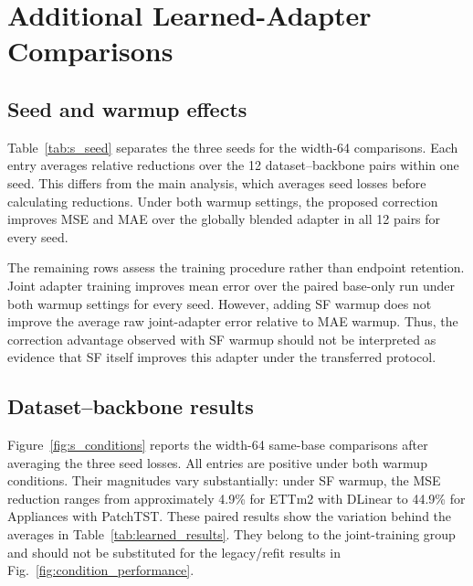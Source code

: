 \appendices
\setcounter{figure}{0}
\renewcommand{\thefigure}{S\arabic{figure}}
\renewcommand{\theHfigure}{supp.\arabic{figure}}
\setcounter{table}{2}
\renewcommand{\thetable}{S\arabic{table}}
\renewcommand{\theHtable}{supp.\arabic{table}}

\section{Additional Learned-Adapter Comparisons}
\label{app:learned}

\subsection{Seed and warmup effects}
Table~\ref{tab:s_seed} separates the three seeds for the width-64 comparisons. Each entry averages relative reductions over the 12 dataset--backbone pairs within one seed. This differs from the main analysis, which averages seed losses before calculating reductions. Under both warmup settings, the proposed correction improves MSE and MAE over the globally blended adapter in all 12 pairs for every seed.

The remaining rows assess the training procedure rather than endpoint retention. Joint adapter training improves mean error over the paired base-only run under both warmup settings for every seed. However, adding SF warmup does not improve the average raw joint-adapter error relative to MAE warmup. Thus, the correction advantage observed with SF warmup should not be interpreted as evidence that SF itself improves this adapter under the transferred protocol.

\begin{table}[!t]
\caption{Width-64 comparisons by training seed. Entries are mean relative reductions (\%) over 12 dataset--backbone pairs within a seed; positive values favor the first method named. Parentheses in row labels identify the warmup loss. Proposed versus adapter uses the same selected joint base and global controller. Joint adapter versus base-only compares the raw adapter with a separately trained paired base model. The last row compares raw joint adapters trained with different warmup losses and does not hold the base forecast fixed. SF denotes MAE plus spectral-flatness warmup.}
\label{tab:s_seed}
\centering

\end{table}

\subsection{Dataset--backbone results}
Figure~\ref{fig:s_conditions} reports the width-64 same-base comparisons after averaging the three seed losses. All entries are positive under both warmup conditions. Their magnitudes vary substantially: under SF warmup, the MSE reduction ranges from approximately 4.9\% for ETTm2 with DLinear to 44.9\% for Appliances with PatchTST. These paired results show the variation behind the averages in Table~\ref{tab:learned_results}. They belong to the joint-training group and should not be substituted for the legacy/refit results in Fig.~\ref{fig:condition_performance}.

